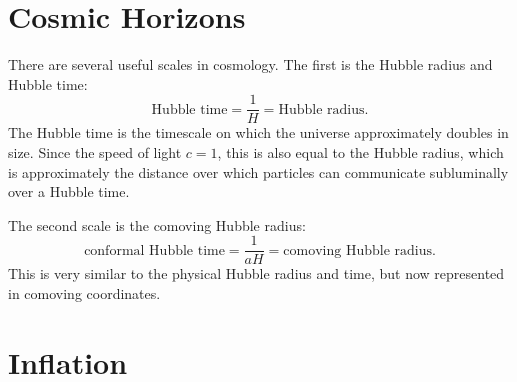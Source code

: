 \section{Cosmic Horizons}
There are several useful scales in cosmology. The first is the Hubble radius and Hubble time:
\begin{equation}
  \text{Hubble time} = \frac{1}{H} = \text{Hubble radius}.
  \label{eqn:cos:Hubble_def}
\end{equation}
The Hubble time is the timescale on which the universe approximately doubles in size. Since the speed of light $c=1$, this is also equal to the Hubble radius, which is approximately the distance over which particles can communicate subluminally over a Hubble time.

The second scale is the comoving Hubble radius:
\begin{equation}
  \text{conformal Hubble time} = \frac{1}{aH} = \text{comoving Hubble radius}.
  \label{eqn:cos:com_Hubble_def}
\end{equation}
This is very similar to the physical Hubble radius and time, but now represented in comoving coordinates.

%
%


\section{Inflation}


\clearpage{}

